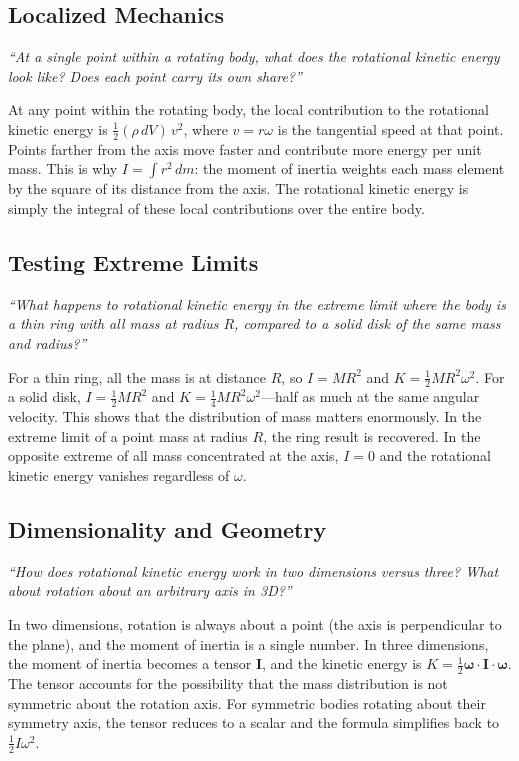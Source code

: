 \documentclass[11pt,openright]{book}
\begin{document}
\subsection*{Localized Mechanics}
\textit{``At a single point within a rotating body, what does the rotational kinetic energy look like? Does each point carry its own share?''}

At any point within the rotating body, the local contribution to the rotational kinetic energy is $\frac{1}{2}(\rho\,dV)\,v^2$, where $v = r\omega$ is the tangential speed at that point. Points farther from the axis move faster and contribute more energy per unit mass. This is why $I = \int r^2\,dm$: the moment of inertia weights each mass element by the square of its distance from the axis. The rotational kinetic energy is simply the integral of these local contributions over the entire body.

\subsection*{Testing Extreme Limits}
\textit{``What happens to rotational kinetic energy in the extreme limit where the body is a thin ring with all mass at radius $R$, compared to a solid disk of the same mass and radius?''}

For a thin ring, all the mass is at distance $R$, so $I = MR^2$ and $K = \frac{1}{2}MR^2\omega^2$. For a solid disk, $I = \frac{1}{2}MR^2$ and $K = \frac{1}{4}MR^2\omega^2$---half as much at the same angular velocity. This shows that the distribution of mass matters enormously. In the extreme limit of a point mass at radius $R$, the ring result is recovered. In the opposite extreme of all mass concentrated at the axis, $I = 0$ and the rotational kinetic energy vanishes regardless of $\omega$.

\subsection*{Dimensionality and Geometry}
\textit{``How does rotational kinetic energy work in two dimensions versus three? What about rotation about an arbitrary axis in 3D?''}

In two dimensions, rotation is always about a point (the axis is perpendicular to the plane), and the moment of inertia is a single number. In three dimensions, the moment of inertia becomes a tensor $\mathbf{I}$, and the kinetic energy is $K = \frac{1}{2}\boldsymbol{\omega}\cdot\mathbf{I}\cdot\boldsymbol{\omega}$. The tensor accounts for the possibility that the mass distribution is not symmetric about the rotation axis. For symmetric bodies rotating about their symmetry axis, the tensor reduces to a scalar and the formula simplifies back to $\frac{1}{2}I\omega^2$.
\end{document}
